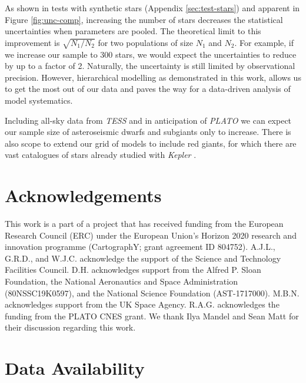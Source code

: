 \documentclass[fleqn,usenatbib]{mnras}
\begin{document}
As shown in tests with synthetic stars (Appendix \ref{sec:test-stars}) and apparent in Figure \ref{fig:unc-comp}, increasing the number of stars decreases the statistical uncertainties when parameters are pooled. The theoretical limit to this improvement is $\sqrt{N_1 / N_2}$ for two populations of size $N_1$ and $N_2$. For example, if we increase our sample to 300 stars, we would expect the uncertainties to reduce by up to a factor of 2. Naturally, the uncertainty is still limited by observational precision. However, hierarchical modelling as demonstrated in this work, allows us to get the most out of our data and paves the way for a data-driven analysis of model systematics.

Including all-sky data from \emph{TESS} and in anticipation of \emph{PLATO} \citep{Rauer.Catala.ea2014} we can expect our sample size of asteroseismic dwarfs and subgiants only to increase. There is also scope to extend our grid of models to include red giants, for which there are vast catalogues of stars already studied with \emph{Kepler} \citep{Pinsonneault.Elsworth.ea2018}.

\section*{Acknowledgements}



This work is a part of a project that has received funding from the European Research Council (ERC) under the European Union’s Horizon 2020 research and innovation programme (CartographY; grant agreement ID 804752). A.J.L., G.R.D., and W.J.C. acknowledge the support of the Science and Technology Facilities Council. D.H. acknowledges support from the Alfred P. Sloan Foundation, the National Aeronautics and Space Administration (80NSSC19K0597), and the National Science Foundation (AST-1717000). M.B.N. acknowledges support from the UK Space Agency. R.A.G. acknowledges the funding from the PLATO CNES grant. We thank Ilya Mandel and Sean Matt for their discussion regarding this work.

\section*{Data Availability}

\end{document}

